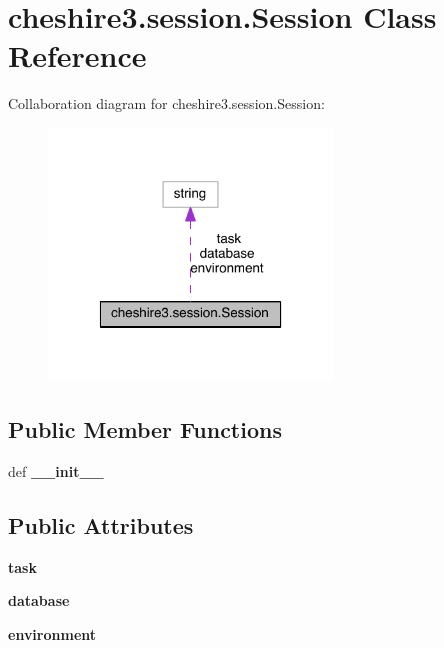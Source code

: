 \hypertarget{classcheshire3_1_1session_1_1_session}{\section{cheshire3.\-session.\-Session Class Reference}
\label{classcheshire3_1_1session_1_1_session}
}


Collaboration diagram for cheshire3.\-session.\-Session\-:
\nopagebreak
\begin{figure}[H]
\begin{center}
\leavevmode
\includegraphics[width=214pt]{classcheshire3_1_1session_1_1_session__coll__graph}
\end{center}
\end{figure}
\subsection*{Public Member Functions}
\begin{DoxyCompactItemize}
\item 
\hypertarget{classcheshire3_1_1session_1_1_session_ac1cd4ebf53d3cfa40fdf7b9915ba3024}{def {\bfseries \-\_\-\-\_\-init\-\_\-\-\_\-}}\label{classcheshire3_1_1session_1_1_session_ac1cd4ebf53d3cfa40fdf7b9915ba3024}

\end{DoxyCompactItemize}
\subsection*{Public Attributes}
\begin{DoxyCompactItemize}
\item 
\hypertarget{classcheshire3_1_1session_1_1_session_aa93901f1ef49a6c93eeb1d41b0a35e64}{{\bfseries task}}\label{classcheshire3_1_1session_1_1_session_aa93901f1ef49a6c93eeb1d41b0a35e64}

\item 
\hypertarget{classcheshire3_1_1session_1_1_session_a78932bc984e1f517ac3f39faea4960b3}{{\bfseries database}}\label{classcheshire3_1_1session_1_1_session_a78932bc984e1f517ac3f39faea4960b3}

\item 
\hypertarget{classcheshire3_1_1session_1_1_session_ac57eda94d4bbb7fc302d9ed266a58fee}{{\bfseries environment}}\label{classcheshire3_1_1session_1_1_session_ac57eda94d4bbb7fc302d9ed266a58fee}

\end{DoxyCompactItemize}
